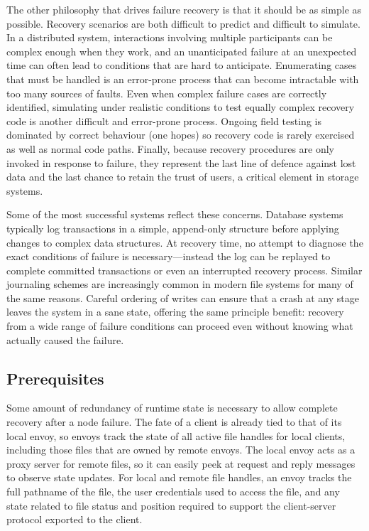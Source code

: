The other philosophy that drives failure recovery is that it should be as simple as possible. Recovery scenarios are both difficult to predict and difficult to simulate. In a distributed system, interactions involving multiple participants can be complex enough when they work, and an unanticipated failure at an unexpected time can often lead to conditions that are hard to anticipate. Enumerating cases that must be handled is an error-prone process that can become intractable with too many sources of faults. Even when complex failure cases are correctly identified, simulating under realistic conditions to test equally complex recovery code is another difficult and error-prone process. Ongoing field testing is dominated by correct behaviour (one hopes) so recovery code is rarely exercised as well as normal code paths. Finally, because recovery procedures are only invoked in response to failure, they represent the last line of defence against lost data and the last chance to retain the trust of users, a critical element in storage systems.

Some of the most successful systems reflect these concerns. Database systems typically log transactions in a simple, append-only structure before applying changes to complex data structures. At recovery time, no attempt to diagnose the exact conditions of failure is necessary---instead the log can be replayed to complete committed transactions or even an interrupted recovery process. Similar journaling schemes are increasingly common in modern file systems for many of the same reasons. Careful ordering of writes can ensure that a crash at any stage leaves the system in a sane state, offering the same principle benefit: recovery from a wide range of failure conditions can proceed even without knowing what actually caused the failure.

\subsection{Prerequisites}

Some amount of redundancy of runtime state is necessary to allow complete recovery after a node failure. The fate of a client is already tied to that of its local envoy, so envoys track the state of all active file handles for local clients, including those files that are owned by remote envoys. The local envoy acts as a proxy server for remote files, so it can easily peek at request and reply messages to observe state updates. For local and remote file handles, an envoy tracks the full pathname of the file, the user credentials used to access the file, and any state related to file status and position required to support the client-server protocol exported to the client.

